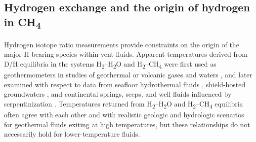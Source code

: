\subsection{\texorpdfstring{Hydrogen exchange and the origin of
		hydrogen in
		CH\textsubscript{4}}{Hydrogen exchange and the origin of hydrogen in CH4}}\label{hydrogen-exchange-and-the-origin-of-hydrogen-in-ch4}

Hydrogen isotope ratio measurements provide constraints on the origin of
the major H-bearing species within vent fluids. Apparent temperatures
derived from D/H equilibria in the systems
H\textsubscript{2}--H\textsubscript{2}O and
H\textsubscript{2}--CH\textsubscript{4} were first used as
geothermometers in studies of geothermal or volcanic gases and waters
\parencite{Arnason_1977_Geothermics,Arnason+Sigurgeirsson_1968_GCA,Gunter+Musgrave_1971_GCA,Panichi++_1977_Geothermics,Panichi+Gonfiantini_1977_Geothermics,Kiyosu_1983_EPSL,Lyon+Hulston_1984_GCA}, and later examined with respect to data from
seafloor hydrothermal fluids \parencite{Welhan+Craig_1983,Horibe+Craig_1995_GCA,Proskurowski++_2006_CG,Bradley+Summons_2010_EPSL,Kawagucci++_2010_JGR,Kawagucci++_2011_GcJ,Kawagucci++_2013_CG}, shield-hosted groundwaters
\parencite{SherwoodLollar++_1993_GCA_abiogenic,SherwoodLollar++_2007_Ab,SherwoodLollar++_2008_GCA}, and continental
springs, seeps, and well fluids influenced by serpentinization \parencite{Fritz++_1992,Neal+Stanger_1983_EPSL,Coveney++_1987_AAPGB,Abrajano++_1988_CG,Etiope++_2011_CG,Suda++_2014_EPSL}. Temperatures returned from
H\textsubscript{2}--H\textsubscript{2}O and
H\textsubscript{2}--CH\textsubscript{4} equilibria often agree with each
other and with realistic geologic and hydrologic scenarios for
geothermal fluids exiting at high temperatures, but these relationships
do not necessarily hold for lower-temperature fluids. 


